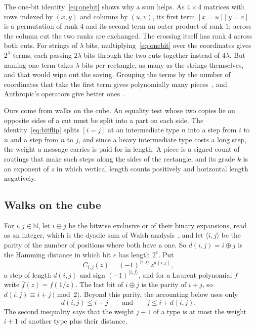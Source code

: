 \documentclass[11pt]{article}
\theoremstyle{definition}
\theoremstyle{definition}
\theoremstyle{remark}
\newcommand{\N}{\mathbb{N}}
\newcommand{\ip}[2]{\langle #1,#2\rangle}
\begin{document}
The one-bit identity~\eqref{eq:onebit} shows why a sum helps. As $4\times4$ matrices with rows indexed by $(x,y)$ and columns by $(u,v)$, its first term $[x=u][y=v]$ is a permutation of rank $4$ and its second term an outer product of rank $1$; across the column cut the two ranks are exchanged. The crossing itself has rank $4$ across both cuts. For strings of $\lambda$ bits, multiplying~\eqref{eq:onebit} over the coordinates gives $2^\lambda$ terms, each passing $2\lambda$ bits through the two cuts together instead of $4\lambda$. But naming one term takes $\lambda$ bits per rectangle, as many as the strings themselves, and that would wipe out the saving. Grouping the terms by the number of coordinates that take the first term gives polynomially many pieces~\cite[Appendix~H]{Ant26}, and Anthropic's operators give better ones~\cite[Appendix~B]{Ant26}.

Ours come from walks on the cube. An equality test whose two copies lie on opposite sides of a cut must be split into a part on each side. The identity~\eqref{eq:bitflip} splits $[i=j]$ at an intermediate type $n$ into a step from $i$ to $n$ and a step from $n$ to $j$, and since a heavy intermediate type costs a long step, the weight a message carries is paid for in length. A piece is a signed count of routings that make such steps along the sides of the rectangle, and its grade $k$ is an exponent of $z$ in which vertical length counts positively and horizontal length negatively.

\subsection{Walks on the cube}

For $i,j\in\N$, let $i\oplus j$ be the bitwise exclusive or of their binary expansions, read as an integer, which is the dyadic sum of Walsh analysis~\cite{SWS90}, and let $\ip ij$ be the parity of the number of positions where both have a one. So $d(i,j)=i\oplus j$ is the Hamming distance in which bit $e$ has length $2^e$. Put
\[
C_{i,j}(z)=(-1)^{\ip ij}\,z^{d(i,j)},
\]
a step of length $d(i,j)$ and sign $(-1)^{\ip ij}$, and for a Laurent polynomial $f$ write $\bar f(z)=f(1/z)$. The last bit of $i\oplus j$ is the parity of $i+j$, so $d(i,j)\equiv i+j\pmod 2$. Beyond this parity, the accounting below uses only
\begin{equation}\label{eq:metric}
d(i,j)\le i+j\qquad\text{and}\qquad j\le i+d(i,j).
\end{equation}
The second inequality says that the weight $j+1$ of a type is at most the weight $i+1$ of another type plus their distance.
\end{document}
